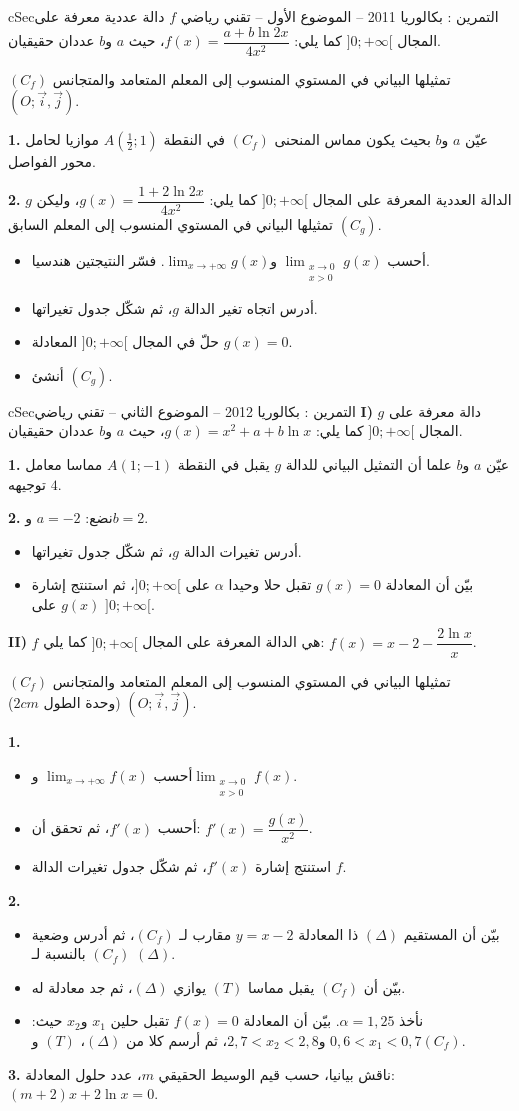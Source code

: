 \documentclass[12pt,a4paper]{article}
\newenvironment{BOX}[2]{\begin{otherlanguage}{english}\begin{arbox}{#1}{#2}}{\end{arbox}\end{otherlanguage}}
\newcounter{exo}
\newenvironment{tamrin}[1]{\stepcounter{exo}\begin{BOX}{cSec}{التمرين \theexo: #1}}{\end{BOX}}
\newenvironment{sq}{\begin{itemize}[leftmargin=2.4em,itemsep=3pt]}{\end{itemize}}
\newcommand{\qa}{\item[(أ)]}\newcommand{\qb}{\item[(ب)]}\newcommand{\qc}{\item[(جـ)]}\newcommand{\qd}{\item[(د)]}\newcommand{\qe}{\item[(هـ)]}
\newcommand{\QQ}[1]{\par\smallskip\textbf{#1.} }
\begin{document}
\begin{tamrin}{بكالوريا 2011 -- الموضوع الأول -- تقني رياضي}
$f$ دالة عددية معرفة على المجال $]0;+\infty[$ كما يلي: $f(x)=\dfrac{a+b\ln 2x}{4x^2}$، حيث $a$ و$b$ عددان حقيقيان.

$(C_f)$ تمثيلها البياني في المستوي المنسوب إلى المعلم المتعامد والمتجانس $(O;\vec{i},\vec{j})$.
\QQ{1} عيّن $a$ و$b$ بحيث يكون مماس المنحنى $(C_f)$ في النقطة $A\left(\frac12;1\right)$ موازيا لحامل محور الفواصل.
\QQ{2} $g$ الدالة العددية المعرفة على المجال $]0;+\infty[$ كما يلي: $g(x)=\dfrac{1+2\ln 2x}{4x^2}$، وليكن $(C_g)$ تمثيلها البياني في المستوي المنسوب إلى المعلم السابق.
\begin{sq}
\qa أحسب $\displaystyle\lim_{\substack{x\to0\\x>0}}g(x)$ و$\displaystyle\lim_{x\to+\infty}g(x)$. فسّر النتيجتين هندسيا.
\qb أدرس اتجاه تغير الدالة $g$، ثم شكّل جدول تغيراتها.
\qc حلّ في المجال $]0;+\infty[$ المعادلة $g(x)=0$.
\qd أنشئ $(C_g)$.
\end{sq}
\end{tamrin}

\begin{tamrin}{بكالوريا 2012 -- الموضوع الثاني -- تقني رياضي}
\textbf{I)} $g$ دالة معرفة على المجال $]0;+\infty[$ كما يلي: $g(x)=x^2+a+b\ln x$، حيث $a$ و$b$ عددان حقيقيان.
\QQ{1} عيّن $a$ و$b$ علما أن التمثيل البياني للدالة $g$ يقبل في النقطة $A(1;-1)$ مماسا معامل توجيهه $4$.
\QQ{2} نضع: $a=-2$ و$b=2$.
\begin{sq}
\qa أدرس تغيرات الدالة $g$، ثم شكّل جدول تغيراتها.
\qb بيّن أن المعادلة $g(x)=0$ تقبل حلا وحيدا $\alpha$ على $]0;+\infty[$، ثم استنتج إشارة $g(x)$ على $]0;+\infty[$.
\end{sq}

\textbf{II)} $f$ هي الدالة المعرفة على المجال $]0;+\infty[$ كما يلي: $f(x)=x-2-\dfrac{2\ln x}{x}$.

$(C_f)$ تمثيلها البياني في المستوي المنسوب إلى المعلم المتعامد والمتجانس $(O;\vec{i},\vec{j})$ (وحدة الطول $2cm$).
\QQ{1}
\begin{sq}
\qa أحسب $\displaystyle\lim_{x\to+\infty}f(x)$ و$\displaystyle\lim_{\substack{x\to0\\x>0}}f(x)$.
\qb أحسب $f'(x)$، ثم تحقق أن: $f'(x)=\dfrac{g(x)}{x^2}$.
\qc استنتج إشارة $f'(x)$، ثم شكّل جدول تغيرات الدالة $f$.
\end{sq}
\QQ{2}
\begin{sq}
\qa بيّن أن المستقيم $(\Delta)$ ذا المعادلة $y=x-2$ مقارب لـ $(C_f)$، ثم أدرس وضعية $(C_f)$ بالنسبة لـ $(\Delta)$.
\qb بيّن أن $(C_f)$ يقبل مماسا $(T)$ يوازي $(\Delta)$، ثم جد معادلة له.
\qc نأخذ $\alpha=1{,}25$. بيّن أن المعادلة $f(x)=0$ تقبل حلين $x_1$ و$x_2$ حيث: $0{,}6<x_1<0{,}7$ و$2{,}7<x_2<2{,}8$، ثم أرسم كلا من $(\Delta)$، $(T)$ و$(C_f)$.
\end{sq}
\QQ{3} ناقش بيانيا، حسب قيم الوسيط الحقيقي $m$، عدد حلول المعادلة: $(m+2)x+2\ln x=0$.
\end{tamrin}
\end{document}
